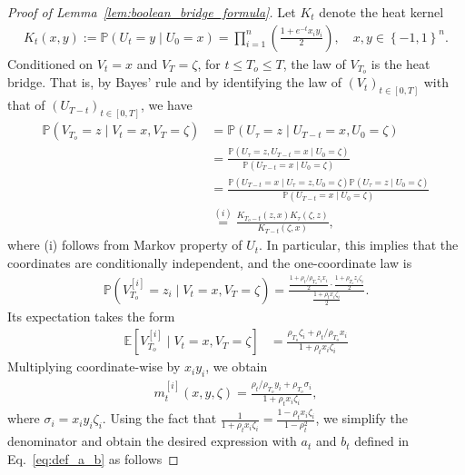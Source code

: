 \documentclass[11pt]{article}
\newcommand{\uV}{V}
\newcommand{\To}{{T_o}}
\theoremstyle{named}
\theoremstyle{plain}
\newcommand{\defn}{:=}
\newcommand{\Exs}{\ensuremath{{\mathbb{E}}}}
\newcommand{\Prob}{\ensuremath{{\mathbb{P}}}}
\newcommand{\brackets}[1]{\left[ #1 \right]}
\newcommand{\parenth}[1]{\left( #1 \right)}
\newcommand{\braces}[1]{\left\{ #1 \right \}}
\begin{document}
\begin{proof}[Proof of Lemma~\ref{lem:boolean_bridge_formula}\label{proof_lem:boolean_bridge_formula}]
  Let $K_t$ denote the heat kernel
  \begin{align}
    \label{eq:heat_kernel}
    K_t(x, y) \defn \Prob(U_t = y \mid U_0 = x) = \prod_{i=1}^n \parenth{\frac{1+e^{-t} x_i y_i}{2}}, \quad x, y \in \braces{-1, 1}^n.
  \end{align}
  Conditioned on $\uV_t = x$ and $\uV_T = \zeta$, for $t \leq \To \leq T$, the law of $\uV_\To$ is the heat bridge. That is, by Bayes' rule and by identifying the law of $(\uV_t)_{t \in [0, T]}$ with that of $(U_{T-t})_{t \in [0, T]}$, we have
  \begin{align*}
    \Prob(\uV_{\To} = z \mid \uV_t = x, \uV_{T} = \zeta) &= \Prob(U_{\tau} = z \mid U_{T-t} = x, U_0 = \zeta) \\
    &= \frac{\Prob(U_{\tau} = z, U_{T-t} = x \mid U_0 = \zeta)}{\Prob(U_{T-t} = x \mid U_0 = \zeta)} \\
    &= \frac{\Prob(U_{T-t} = x \mid U_{\tau} = z, U_0 = \zeta) \Prob(U_{\tau} = z \mid U_0 = \zeta)}{\Prob(U_{T-t} = x \mid U_0 = \zeta)} \\
    &\overset{(i)}{=} \frac{K_{\To-t}(z, x) K_{\tau}(\zeta, z)}{K_{T-t}(\zeta, x)},
\end{align*}
  where (i) follows from Markov property of $U_t$. In particular, this implies that the coordinates are conditionally independent, and the one-coordinate law is
  \begin{align*}
    \Prob\parenth{\uV_{\To}^{[i]} = z_i \mid \uV_t = x, \uV_{T} = \zeta} =  \frac{ \frac{1+ \rho_t/\rho_{\To} z_i x_i }{2} \cdot \frac{1 + \rho_\To z_i \zeta_i}{2}  }{\frac{1+\rho_t x_i \zeta_i}{2}}.
  \end{align*}
  Its expectation takes the form
  \begin{align*}
    \Exs\brackets{\uV_{\To}^{[i]} \mid \uV_t = x, \uV_{T} = \zeta} &= \frac{\rho_\To \zeta_i + \rho_t/\rho_{\To} x_i}{1+\rho_t x_i \zeta_i}
  \end{align*}
  Multiplying coordinate-wise by $x_i y_i$, we obtain
  \begin{align*}
    m_{t}^{[i]}(x, y, \zeta) = \frac{\rho_t/\rho_{\To} y_i + \rho_\To \sigma_i}{1+\rho_t x_i \zeta_i},
  \end{align*}
  where $\sigma_i = x_i y_i \zeta_i$.
  Using the fact that $\frac{1}{1+\rho_t x_i \zeta_i} = \frac{1 - \rho_t x_i \zeta_i}{1 - \rho_t^2}$, we simplify the denominator and obtain the desired expression with $a_{t}$ and $b_{t}$ defined in Eq.~\eqref{eq:def_a_b} as follows

\end{proof}
\end{document}
